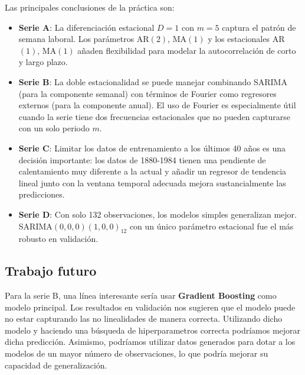 \documentclass[12pt,a4paper]{article}
\begin{document}
Las principales conclusiones de la práctica son:

\begin{itemize}
    \item \textbf{Serie A}: La diferenciación estacional $D=1$ con $m=5$ captura el patrón de semana laboral. Los parámetros AR$(2)$, MA$(1)$ y los estacionales AR$(1)$, MA$(1)$ añaden flexibilidad para modelar la autocorrelación de corto y largo plazo.

    \item \textbf{Serie B}: La doble estacionalidad se puede manejar combinando SARIMA (para la componente semanal) con términos de Fourier como regresores externos (para la componente anual). El uso de Fourier es especialmente útil cuando la serie tiene dos frecuencias estacionales que no pueden capturarse con un solo periodo $m$.

    \item \textbf{Serie C}: Limitar los datos de entrenamiento a los últimos 40 años es una decisión importante: los datos de 1880-1984 tienen una pendiente de calentamiento muy diferente a la actual y añadir un regresor de tendencia lineal junto con la ventana temporal adecuada mejora sustancialmente las predicciones.

    \item \textbf{Serie D}: Con solo 132 observaciones, los modelos simples generalizan mejor. SARIMA$(0,0,0)(1,0,0)_{12}$ con un único parámetro estacional fue el más robusto en validación.
\end{itemize}

\subsection*{Trabajo futuro}

Para la serie B, una línea interesante sería usar \textbf{Gradient Boosting} como modelo principal. Los resultados en validación nos sugieren que el modelo puede no estar capturando las no linealidades de manera correcta. Utilizando dicho modelo y haciendo una búsqueda de hiperparametros correcta podríamos mejorar dicha predicción. Asimismo, podríamos utilizar datos generados para dotar a los modelos de un mayor número de observaciones, lo que podría mejorar su capacidad de generalización.
\end{document}
